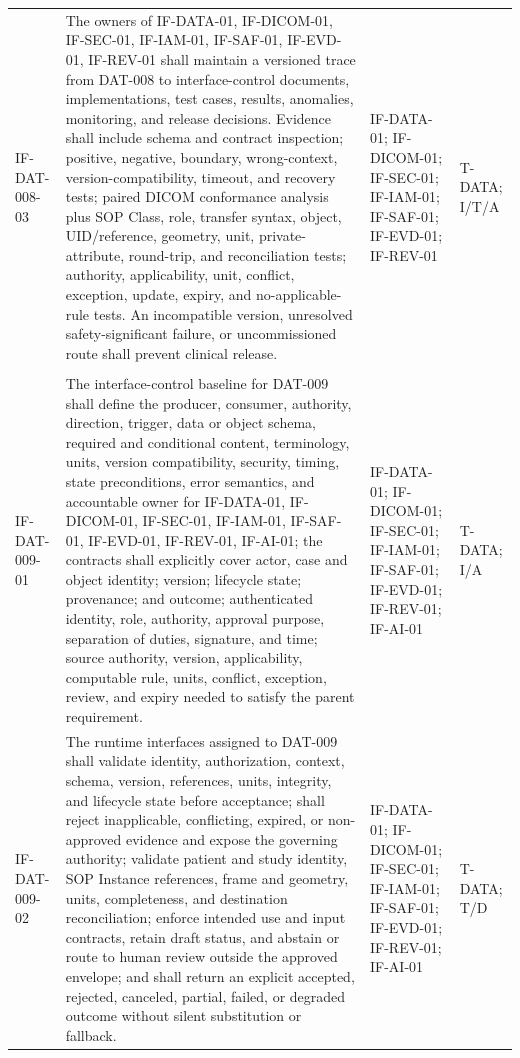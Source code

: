 \documentclass[11pt,letterpaper]{article}
\begin{document}
\begin{scriptsize}
\begin{longtable}{@{}L{0.14\textwidth}L{0.49\textwidth}L{0.19\textwidth}L{0.10\textwidth}@{}}
\addlinespace[2pt]
\mbox{IF-DAT-008-03} & The owners of IF-DATA-01, IF-DICOM-01, IF-SEC-01, IF-IAM-01, IF-SAF-01, IF-EVD-01, IF-REV-01 shall maintain a versioned trace from DAT-008 to interface-control documents, implementations, test cases, results, anomalies, monitoring, and release decisions. Evidence shall include schema and contract inspection; positive, negative, boundary, wrong-context, version-compatibility, timeout, and recovery tests; paired DICOM conformance analysis plus SOP Class, role, transfer syntax, object, UID\slash\allowbreak{}reference, geometry, unit, private-attribute, round-trip, and reconciliation tests; authority, applicability, unit, conflict, exception, update, expiry, and no-applicable-rule tests. An incompatible version, unresolved safety-significant failure, or uncommissioned route shall prevent clinical release. & IF-DATA-01; IF-DICOM-01; IF-SEC-01; IF-IAM-01; IF-SAF-01; IF-EVD-01; IF-REV-01 & T-DATA; I\slash\allowbreak{}T\slash\allowbreak{}A \\
\addlinespace[2pt]
 \\
\addlinespace[2pt]
\mbox{IF-DAT-009-01} & The interface-control baseline for DAT-009 shall define the producer, consumer, authority, direction, trigger, data or object schema, required and conditional content, terminology, units, version compatibility, security, timing, state preconditions, error semantics, and accountable owner for IF-DATA-01, IF-DICOM-01, IF-SEC-01, IF-IAM-01, IF-SAF-01, IF-EVD-01, IF-REV-01, IF-AI-01; the contracts shall explicitly cover actor, case and object identity; version; lifecycle state; provenance; and outcome; authenticated identity, role, authority, approval purpose, separation of duties, signature, and time; source authority, version, applicability, computable rule, units, conflict, exception, review, and expiry needed to satisfy the parent requirement. & IF-DATA-01; IF-DICOM-01; IF-SEC-01; IF-IAM-01; IF-SAF-01; IF-EVD-01; IF-REV-01; IF-AI-01 & T-DATA; I\slash\allowbreak{}A \\
\addlinespace[2pt]
\mbox{IF-DAT-009-02} & The runtime interfaces assigned to DAT-009 shall validate identity, authorization, context, schema, version, references, units, integrity, and lifecycle state before acceptance; shall reject inapplicable, conflicting, expired, or non-approved evidence and expose the governing authority; validate patient and study identity, SOP Instance references, frame and geometry, units, completeness, and destination reconciliation; enforce intended use and input contracts, retain draft status, and abstain or route to human review outside the approved envelope; and shall return an explicit accepted, rejected, canceled, partial, failed, or degraded outcome without silent substitution or fallback. & IF-DATA-01; IF-DICOM-01; IF-SEC-01; IF-IAM-01; IF-SAF-01; IF-EVD-01; IF-REV-01; IF-AI-01 & T-DATA; T\slash\allowbreak{}D \\

\end{longtable}
\end{scriptsize}
\end{document}
